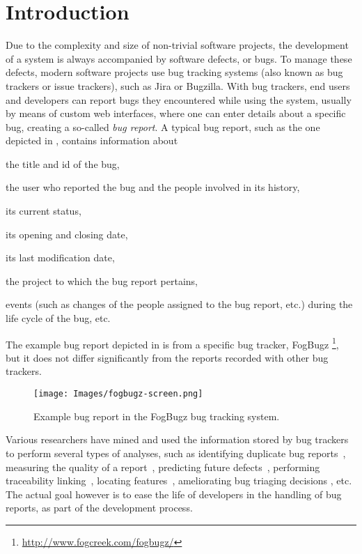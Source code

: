 \section{Introduction}

Due to the complexity and size of non-trivial software projects, the development of a system is always accompanied by software defects, or bugs. To manage these defects, modern software projects use bug tracking systems (also known as bug trackers or issue trackers), such as Jira or Bugzilla. With bug trackers, end users and developers can report bugs they encountered while using the system, usually by means of custom web interfaces, where one can enter details about a specific bug, creating a so-called \emph{bug report}. A typical bug report, such as the one depicted in , contains information about \begin{inparaenum}[(1)] \item the title and id of the bug, \item the user who reported the bug and the people involved in its history, \item its current status, \item its opening and closing date, \item its last modification date, \item the project to which the bug report pertains, \item events (such as changes of the people assigned to the bug report, etc.) during the life cycle of the bug, etc. \end{inparaenum} The example bug report depicted in  is from a specific bug tracker, FogBugz \footnote{\url{http://www.fogcreek.com/fogbugz/}}, but it does not differ significantly from the reports recorded with other bug trackers.

\begin{figure}[ht]
\centering
\texttt{[image: Images/fogbugz-screen.png]}
\caption{Example bug report in the FogBugz bug tracking system.}
\label{fogbugz-example}
\end{figure}

Various researchers have mined and used the information stored by bug trackers to perform several types of analyses, such as identifying duplicate bug reports~\cite{Wang2008a}, measuring the quality of a report~\cite{Bettenburg08}, predicting future defects~\cite{DAmb2012a}, performing traceability linking~\cite{Biss2013a}, locating features~\cite{Dit2013a}, ameliorating bug triaging decisions \cite{Anvi2006a}, etc. The actual goal however is to ease the life of developers in the handling of bug reports, as part of the development process.

